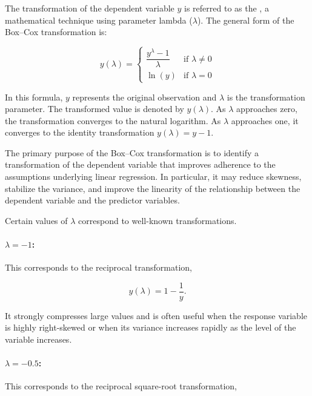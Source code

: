 \bigskip

The transformation of the dependent variable \(y\) is referred to as the , a mathematical technique using parameter lambda (\(\lambda\)). The general form of the Box--Cox transformation is:

\begin{equation}
y(\lambda) =
\begin{cases}
\dfrac{y^\lambda - 1}{\lambda} & \text{if } \lambda \neq 0 \\
\ln(y) & \text{if } \lambda = 0
\end{cases}
\end{equation}

In this formula, \(y\) represents the original observation and \(\lambda\) is the transformation parameter. The transformed value is denoted by \(y(\lambda)\). As \(\lambda\) approaches zero, the transformation converges to the natural logarithm. As \(\lambda\) approaches one, it converges to the identity transformation \(y(\lambda)=y-1\).

\bigskip

The primary purpose of the Box--Cox transformation is to identify a transformation of the dependent variable that improves adherence to the assumptions underlying linear regression. In particular, it may reduce skewness, stabilize the variance, and improve the linearity of the relationship between the dependent variable and the predictor variables.

\bigskip

Certain values of \(\lambda\) correspond to well-known transformations.

\paragraph{\(\lambda = -1\):}
This corresponds to the reciprocal transformation,

\[
y(\lambda)=1-\frac{1}{y}.
\]

It strongly compresses large values and is often useful when the response variable is highly right-skewed or when its variance increases rapidly as the level of the variable increases.

\paragraph{\(\lambda = -0.5\):}
This corresponds to the reciprocal square-root transformation,

